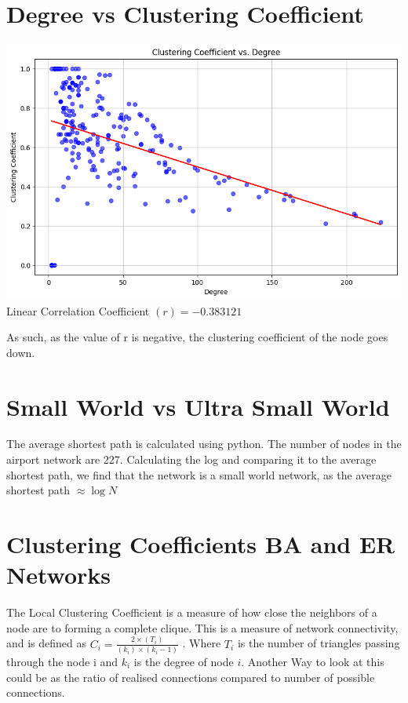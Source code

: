 \documentclass[11pt]{article}
\begin{document}
\section{Degree vs Clustering Coefficient}
\begin{center}
    \includegraphics[scale=0.6]{ccvd.png}\\
    Linear Correlation Coefficient $(r) = -0.383121$ 
\end{center}
As such, as the value of r is negative, the clustering coefficient of the node goes down.
\section{Small World vs Ultra Small World}
The average shortest path is calculated using python. The number of nodes in the airport network are 227. Calculating the log and comparing it to the average shortest path, we find that the network is a small world network, as the average shortest path $\approx \log{N}$
\pagebreak
\section{Clustering Coefficients BA and ER Networks}
The Local Clustering Coefficient is a measure of how close the neighbors of a node are to forming a complete clique. This is a measure of network connectivity, and is defined as $C_i = \frac{2 \times (T_i)}{(k_i) \times (k_i - 1)} $ . Where $T_i$ is the number of triangles passing through the node i and $k_i$ is the degree of node $i$. Another Way to look at this could be as the ratio of realised connections compared to number of possible connections.
\end{document}
